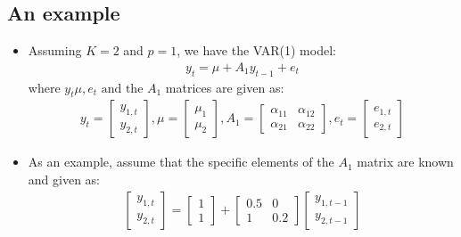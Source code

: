 \documentclass[10pt]{article}
\begin{document}
\subsection{An example}
\begin{itemize}
    \item Assuming $K = 2 $ and $p = 1 $, we have the VAR(1) model: 
    \begin{gather*}
        y_t = \mu + A_1y_{t - 1} + e_t
    \end{gather*}
    where $y_t \mu, e_t\text{ and the }A_1 $ matrices are given as: 
    \begin{gather*}
        y_t = 
        \begin{bmatrix}
            y_{1, t}\\
            y_{2, t}
        \end{bmatrix},
        \mu = 
        \begin{bmatrix}
            \mu_1 \\ \mu_2
        \end{bmatrix},
        A_1 = 
        \begin{bmatrix}
            \alpha_{11} & \alpha_{12}\\
            \alpha_{21} & \alpha_{22}
        \end{bmatrix},
        e_t = 
        \begin{bmatrix}
            e_{1, t}\\
            e_{2, t}
        \end{bmatrix}
    \end{gather*}
    \item As an example, assume that the specific elements of the $A_1 $ matrix are known and given as: 
    \begin{gather*}
        \begin{bmatrix}
            y_{1, t}\\
            y_{2, t}
        \end{bmatrix}
        = 
        \begin{bmatrix}
            1 \\ 1
        \end{bmatrix}
        +
        \begin{bmatrix}
            0.5 & 0 \\
            1 & 0.2
        \end{bmatrix}
        \begin{bmatrix}
            y_{1, t - 1}\\
            y_{2, t - 1}
        \end{bmatrix}

\end{gather*}
\end{itemize}
\end{document}
